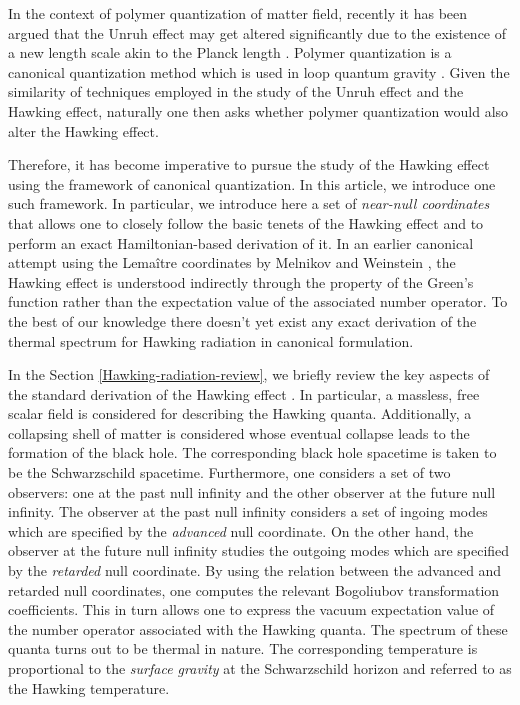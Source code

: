 \documentclass[aps,twocolumn,showpacs]{revtex4}
\begin{document}
In the context of polymer quantization of matter field, recently it has been 
argued that the Unruh effect \cite{Fulling:1972md,Unruh:1976db,Crispino:2007eb} 
may get altered significantly due to the existence of a new length scale akin to 
the Planck length  \cite{Hossain:2014fma,Hossain:2015xqa,Hossain:2016klt}. 
Polymer quantization \cite{Ashtekar:2002sn,Halvorson-2004-35} is a canonical 
quantization method which is used in loop quantum gravity 
\cite{Ashtekar:2004eh,Rovelli2004quantum,Thiemann2007modern}. Given the 
similarity of techniques employed in the study of the Unruh effect and the 
Hawking effect, naturally one then asks whether polymer quantization would also 
alter the Hawking effect.



Therefore, it has become imperative to pursue the study of the Hawking effect 
using the framework of canonical quantization. In this article, we introduce one 
such framework. In particular, we  introduce here a set of \emph{near-null 
coordinates} that allows one to closely follow the basic tenets of the Hawking 
effect and  to perform an exact Hamiltonian-based derivation of it. In an 
earlier canonical attempt using the Lema\^itre coordinates by Melnikov and 
Weinstein \cite{Melnikov:2001ex}, the Hawking effect is understood indirectly 
through the property of the Green's function rather than the expectation value 
of the associated number operator. To the best of our knowledge there doesn't 
yet exist any exact derivation of the thermal spectrum for Hawking radiation in 
canonical formulation. 




In the Section \ref{Hawking-radiation-review}, we briefly review the key aspects 
of the standard derivation of the Hawking effect \cite{hawking1975}. In 
particular, a massless, free scalar field is considered for describing the 
Hawking quanta. Additionally, a collapsing shell of matter is considered whose 
eventual collapse leads to the formation of the black hole. The corresponding 
black hole spacetime is taken to be the Schwarzschild spacetime. Furthermore, 
one considers a set of two observers: one at the past null infinity and the 
other observer at the future null infinity. The observer at the past null 
infinity considers a set of ingoing modes which are specified by the 
\emph{advanced} null coordinate. On the other hand, the observer at the future 
null infinity studies the outgoing modes which are specified by the 
\emph{retarded} null coordinate. By using the relation between the advanced 
and retarded null coordinates, one computes the relevant Bogoliubov 
transformation coefficients. This in turn allows one to express the vacuum 
expectation value of the number operator associated with the Hawking quanta. The 
spectrum of these quanta turns out to be thermal in nature. The corresponding 
temperature is proportional to the \emph{surface gravity} at the Schwarzschild 
horizon and referred to as the Hawking temperature.
\end{document}
